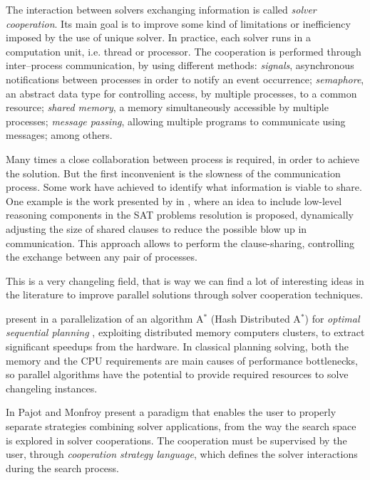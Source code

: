 The interaction between solvers exchanging information is called {\it solver cooperation}. %
Its main goal is to improve some kind of limitations or inefficiency imposed by the use of unique solver. In practice, each solver runs in a computation unit, i.e. thread or processor. The cooperation is performed through inter--process communication, by using different methods: \textit{signals}, asynchronous notifications between processes in order to notify an event occurrence; \textit{semaphore}, an abstract data type for controlling access, by multiple processes, to a common resource; \textit{shared memory}, a memory simultaneously accessible by multiple processes; \textit{message passing}, allowing multiple programs to communicate using messages; among others.

Many times a close collaboration between process is required, in order to achieve the solution. But the first inconvenient is the slowness of the communication process. Some work have achieved to identify what information is viable to share. One example is the work presented by  in \cite{Hamadi2012}, where an idea to include low-level reasoning components in the SAT problems resolution is proposed, dynamically adjusting the size of shared clauses to reduce the possible blow up in communication. This approach allows to perform the clause-sharing, controlling the exchange between any pair of processes.

This is a very changeling field, that is way we can find a lot of interesting ideas in the literature to improve parallel solutions through solver cooperation techniques. 

 present in \cite{Kishimoto2009} a parallelization of an algorithm A$^*$ (Hash Distributed A$^*$) for \textit{optimal sequential planning} \cite{Schmegner2004}, exploiting distributed memory computers clusters, to extract significant speedups from the hardware. In classical planning solving, both the memory and the CPU requirements are main causes of performance bottlenecks, so parallel algorithms have the potential to provide required resources to solve changeling instances. 

In \cite{Pajot2003} Pajot and Monfroy present a paradigm that enables the user to properly separate strategies combining solver applications, from the way the search space is explored in solver cooperations. The cooperation must be supervised by the user, through {\it cooperation strategy language}, which defines the solver interactions during the search process.

